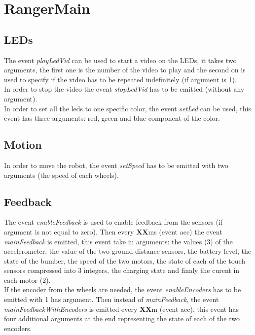 \documentclass[a4paper,11pt]{report}
\begin{document}
\section{RangerMain}
\subsection{LEDs}
The event \textit{playLedVid} can be used to start a video on the LEDs, it takes two arguments, the first one is the number of the video to play and the second on is used to specify if the video has to be repeated indefinitely (if argument is 1).\\

In order to stop the video the event \textit{stopLedVid} has to be emitted (without any argument).\\

In order to set all the leds to one specific color, the event \textit{setLed} can be used, this event has three arguments: red, green and blue component of the color.\\

\subsection{Motion}

In order to move the robot, the event \textit{setSpeed} has to be emitted with two arguments (the speed of each wheels).\\

\newpage
\subsection{Feedback}

The event \textit{enableFeedback} is used to enable feedback from the sensors (if argument is not equal to zero). Then every \textbf{XX}ms (event acc) the event \textit{mainFeedback} is emitted, this event take in arguments: the values (3) of the accelerometer, the value of the two ground distance sensors, the battery level, the state of the bumber, the speed of the two motors, the state of each of the touch sensors compressed into 3 integers, the charging state and finaly the curent in each motor (2).\\

If the encoder from the wheels are needed, the event \textit{enableEncoders} has to be emitted with 1 has argument. Then instead of  \textit{mainFeedback}, the event  \textit{mainFeedbackWithEncoders} is emitted every \textbf{XX}m (event acc), this event has four additional arguments at the end representing the state of each of the two encoders.\\
\end{document}

